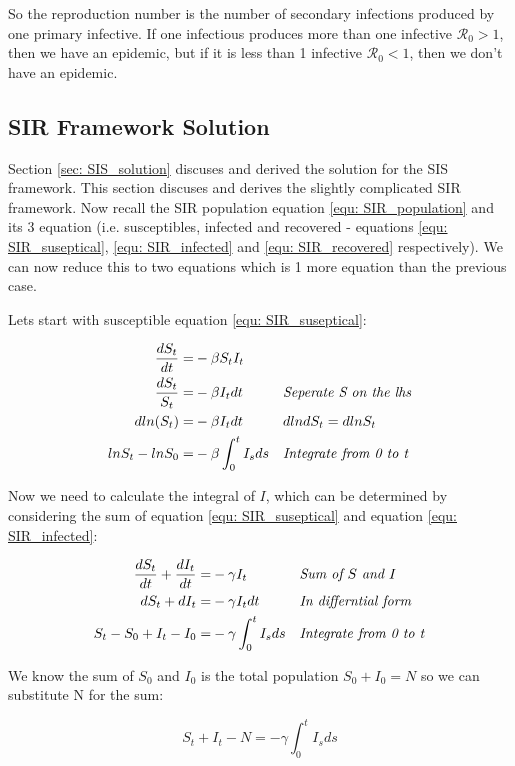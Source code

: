 \documentclass[fontsize=17pt]{article}
\begin{document}
So the reproduction number is the number of secondary infections produced by one primary infective. If one infectious produces more than one infective $\mathscr{R}_{0}>1$, then we have an epidemic, but if it is less than 1 infective $\mathscr{R}_{0}<1$, then we don't have an epidemic.

\subsection{SIR Framework Solution}
Section \ref{sec: SIS_solution} discuses and derived the solution for the SIS framework. This section discuses and derives the slightly complicated SIR framework. 
Now recall the SIR population equation \ref{equ: SIR_population} and its 3 equation (i.e. susceptibles, infected and recovered - equations \ref{equ: SIR_suseptical}, \ref{equ: SIR_infected} and \ref{equ: SIR_recovered} respectively). We can now reduce this to two equations which is 1 more equation than the previous case.

Lets start with susceptible equation \ref{equ: SIR_suseptical}:

 \begin{align}
 \frac{dS_{t}}{dt}=&-\beta S_{t}I_{t}&& \\
\frac{dS_{t}}{S_{t}}=&-\beta I_{t}dt&& \text{\textit{Seperate S on the lhs}}\\
dln(S_{t})=&-\beta I_{t}dt&&dlndS_{t}=dlnS_{t} \\ \label{equ: main_equation}
lnS_{t}-lnS_{0}=&-\beta \int_{0}^{t}I_{s}ds&&\text{\textit{Integrate from 0 to t}}
\end{align}

Now we need to calculate the integral of $I$, which can be determined by considering the sum of equation \ref{equ: SIR_suseptical} and equation \ref{equ: SIR_infected}:


 \begin{align}
\label{equ: sumSI}\frac{dS_{t}}{dt}+\frac{dI_{t}}{dt}=&-\gamma I_{t}&& \text{\textit{Sum of $S$ and $I$}}\\
dS_{t}+dI_{t}=&-\gamma I_{t}dt&& \text{\textit{In differntial form}}\\
S_{t}-S_{0}+I_{t}-I_{0}=&-\gamma\int_{0}^{t} I_{s}ds&&\text{\textit{Integrate from 0 to t}}
\end{align}

We know the sum of $S_{0}$ and $I_{0}$ is the total population $S_{0}+I_{0}=N$ so we can substitute N for the sum:

\begin{equation}
S_{t}+I_{t}-N=-\gamma\int_{0}^{t} I_{s}ds
\end{equation}
\end{document}
